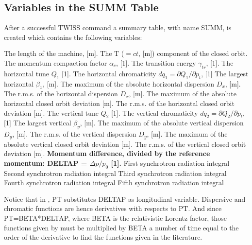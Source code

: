 \subsection{Variables in the SUMM Table}
\label{subsec:tables_summ}
After a successful TWISS command a summary table, with name SUMM, is created which
contains the following variables:  

\begin{madlist}
	 The length of the machine, [m].     
	 The T ($= c t$, [m]) component of the closed orbit.     
	 The momentum compaction factor $\alpha_c$, [1].     
	 The transition energy $\gamma_{tr}$, [1].     
	 The horizontal tune $Q_1$ [1].     
	 The horizontal chromaticity $dq_1 = \partial Q_1 / \partial p_t$, [1]
	 The largest horizontal $\beta_x$, [m].     
	 The maximum of the absolute horizontal dispersion $D_x$, [m].     
	 The r.m.s. of the horizontal dispersion $D_x$, [m].     
	 The maximum of the absolute horizontal closed orbit deviation [m].     
	 The r.m.s. of the horizontal closed orbit deviation [m].     
	 The vertical tune $Q_2$ [1].     
	 The vertical chromaticity $dq_2 = \partial Q_2 / \partial p_t$, [1]
	 The largest vertical $\beta_y$, [m].     
	 The maximum of the absolute vertical dispersion $D_y$, [m].     
	 The r.m.s. of the vertical dispersion $D_y$, [m].     
	 The maximum of the absolute vertical closed orbit deviation [m].     
	 The r.m.s. of the vertical closed orbit deviation [m].     
	 {\bf Momentum difference, divided by the reference
	momentum: DELTAP = $\Delta p / p_0$ [1].}
	 First synchrotron radiation integral  
	 Second synchrotron radiation integral  
	 Third synchrotron radiation integral  
	 Fourth synchrotron radiation integral  
	 Fifth synchrotron radiation integral  
\end{madlist}

Notice that in \madx, PT substitutes DELTAP as longitudinal
variable. Dispersive and chromatic functions are hence derivatives with
respects to PT.
And since PT=BETA*DELTAP, where BETA is the relativistic Lorentz 
factor, those functions given by \madx must be multiplied by BETA a
number of time equal to the order of the derivative to find the
functions given in the literature. 

